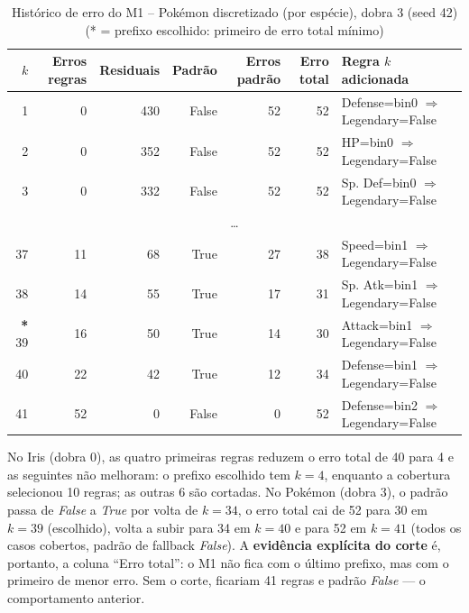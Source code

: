 \documentclass[a4paper,11pt]{article}
\begin{document}
\begin{table}[htbp]
\centering
\small
\caption{Histórico de erro do M1 -- Pokémon discretizado (por espécie), dobra 3 (seed 42) (* = prefixo escolhido: primeiro de erro total mínimo)}
\label{tab:m1_pokemon}
\begin{tabular}{rrrrrrp{5.2cm}}
\toprule
$k$ & Erros regras & Residuais & Padrão & Erros padrão & Erro total & Regra $k$ adicionada \\
\midrule
1 & 0 & 430 & False & 52 & 52 & Defense=bin0 $\Rightarrow$ Legendary=False \\
2 & 0 & 352 & False & 52 & 52 & HP=bin0 $\Rightarrow$ Legendary=False \\
3 & 0 & 332 & False & 52 & 52 & Sp. Def=bin0 $\Rightarrow$ Legendary=False \\
\multicolumn{7}{c}{\ldots} \\
37 & 11 & 68 & True & 27 & 38 & Speed=bin1 $\Rightarrow$ Legendary=False \\
38 & 14 & 55 & True & 17 & 31 & Sp. Atk=bin1 $\Rightarrow$ Legendary=False \\
\textbf{*} 39 & 16 & 50 & True & 14 & 30 & Attack=bin1 $\Rightarrow$ Legendary=False \\
40 & 22 & 42 & True & 12 & 34 & Defense=bin1 $\Rightarrow$ Legendary=False \\
41 & 52 & 0 & False & 0 & 52 & Defense=bin2 $\Rightarrow$ Legendary=False \\
\bottomrule
\end{tabular}
\end{table}

No Iris (dobra 0), as quatro primeiras regras reduzem o erro total de 40 para 4 e as seguintes n\~ao melhoram: o prefixo escolhido tem $k=4$, enquanto a cobertura selecionou 10 regras; as outras 6 s\~ao cortadas. No Pok\'emon (dobra 3), o padr\~ao passa de \emph{False} a \emph{True} por volta de $k=34$, o erro total cai de 52 para 30 em $k=39$ (escolhido), volta a subir para 34 em $k=40$ e para 52 em $k=41$ (todos os casos cobertos, padr\~ao de fallback \emph{False}). A \textbf{evid\^encia expl\'icita do corte} \'e, portanto, a coluna ``Erro total'': o M1 n\~ao fica com o \'ultimo prefixo, mas com o primeiro de menor erro. Sem o corte, ficariam 41 regras e padr\~ao \emph{False} --- o comportamento anterior.
\end{document}
